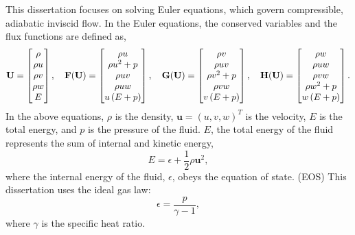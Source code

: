 This dissertation focuses on solving Euler equations, which govern
compressible, adiabatic inviscid flow.
In the Euler equations, the conserved variables and the flux functions are defined as,
\begin{equation}\label{eq:euler-3d}
    \mathbf{U} = \begin{bmatrix}
        \rho \\
        \rho u \\
        \rho v \\
        \rho w \\
        E
    \end{bmatrix},\quad
    \mathbf{F} (\mathbf{U}) = \begin{bmatrix}
        \rho u \\
        \rho u^{2} + p \\
        \rho u v \\
        \rho u w \\
        u \left( E + p \right)
    \end{bmatrix},\quad
    \mathbf{G} (\mathbf{U}) = \begin{bmatrix}
        \rho v \\
        \rho u v \\
        \rho v^{2} + p \\
        \rho v w \\
        v \left( E + p \right)
    \end{bmatrix},\quad
    \mathbf{H} (\mathbf{U}) = \begin{bmatrix}
        \rho w \\
        \rho u w \\
        \rho v w \\
        \rho w^{2} + p \\
        w \left( E + p \right)
    \end{bmatrix}.
\end{equation}
In the above equations, \( \rho \) is the density,
\( \mathbf{u} = {(u, v, w)}^{T} \) is the velocity,
\( E \) is the total energy, and \( p \) is the pressure of the fluid.
\( E \), the total energy of the fluid represents the
sum of internal and kinetic energy,
\begin{equation}\label{eq:total_E}
    E = \epsilon + \frac{1}{2} \rho \mathbf{u}^{2},
\end{equation}
where the internal energy of the fluid, \( \epsilon \), obeys the equation of state. (EOS)
This dissertation uses the ideal gas law:
\begin{equation}\label{eq:ideal_eos}
    \epsilon = \frac{p}{\gamma - 1},
\end{equation}
where \( \gamma \) is the specific heat ratio.


